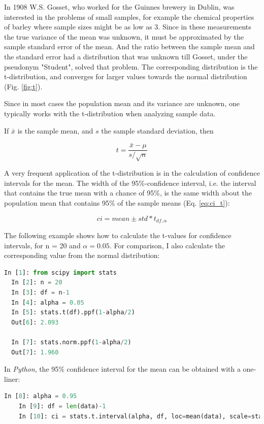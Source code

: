 In 1908 W.S. Gosset, who worked for the Guinnes brewery in Dublin, was interested in the problems of small samples, for example the chemical properties of barley where sample sizes might be as low as 3. Since in these measurements the true variance of the mean was unknown, it must be approximated by the sample standard error of the mean. And the ratio between the sample mean and the standard error had a distribution that was unknown till Gosset, under the  pseudonym "Student", solved that problem.
The corresponding distribution is the t-distribution, and converges for larger values towards the normal distribution (Fig. \ref{fig:t}).

Since in most cases the population mean and its variance are unknown, one typically works with the t-distribution when analyzing sample data.

If $\bar{x}$ is the sample mean, and $s$ the sample standard deviation, then

\begin{equation}
  t = \frac{\bar{x}-\mu}{s/ \sqrt{n}}
\end{equation}\label{eq:Tdistribution}

A very frequent application of the t-distribution is in the calculation of confidence intervals for the mean. The width of the 95\%-confidence interval, i.e. the interval that contains the true mean with a chance of 95\%, is the same width about the population mean that contains 95\% of the sample means (Eq. \ref{eq:ci_t}):

\begin{equation}
  ci = mean \pm std * t_{df,\alpha}
\end{equation}\label{eq:ci_t}

The following example shows how to calculate the t-values for confidence intervals, for n = 20 and $\alpha=0.05$. For comparison, I also calculate the corresponding value from the normal distribution:

\begin{lstlisting}[language=Python]
  In [1]: from scipy import stats
  In [2]: n = 20
  In [3]: df = n-1
  In [4]: alpha = 0.05
  In [5]: stats.t(df).ppf(1-alpha/2)
  Out[6]: 2.093

  In [7]: stats.norm.ppf(1-alpha/2)
  Out[7]: 1.960
\end{lstlisting}


In \emph{Python}, the 95\% confidence interval for the mean can be obtained with a one-liner:

\begin{lstlisting}[language=Python]
    In [8]: alpha = 0.95
    In [9]: df = len(data)-1
    In [10]: ci = stats.t.interval(alpha, df, loc=mean(data), scale=stats.sem(data))
\end{lstlisting}


